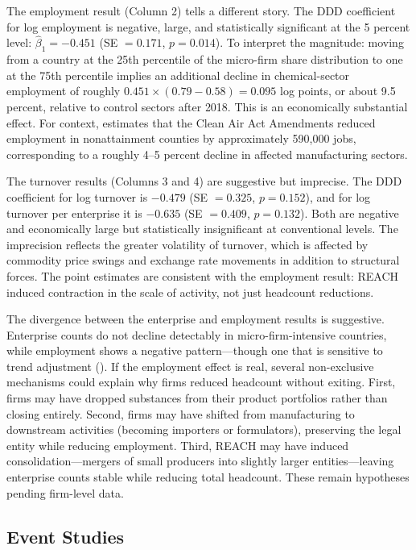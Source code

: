 \documentclass[12pt]{article}
\begin{document}
The employment result (Column 2) tells a different story. The DDD coefficient for log employment is negative, large, and statistically significant at the 5 percent level: $\hat{\beta}_1 = -0.451$ (SE $= 0.171$, $p = 0.014$). To interpret the magnitude: moving from a country at the 25th percentile of the micro-firm share distribution to one at the 75th percentile implies an additional decline in chemical-sector employment of roughly $0.451 \times (0.79 - 0.58) = 0.095$ log points, or about 9.5 percent, relative to control sectors after 2018. This is an economically substantial effect. For context, \citet{greenstone2002} estimates that the Clean Air Act Amendments reduced employment in nonattainment counties by approximately 590,000 jobs, corresponding to a roughly 4--5 percent decline in affected manufacturing sectors.

The turnover results (Columns 3 and 4) are suggestive but imprecise. The DDD coefficient for log turnover is $-0.479$ (SE $= 0.325$, $p = 0.152$), and for log turnover per enterprise it is $-0.635$ (SE $= 0.409$, $p = 0.132$). Both are negative and economically large but statistically insignificant at conventional levels. The imprecision reflects the greater volatility of turnover, which is affected by commodity price swings and exchange rate movements in addition to structural forces. The point estimates are consistent with the employment result: REACH induced contraction in the scale of activity, not just headcount reductions.

The divergence between the enterprise and employment results is suggestive. Enterprise counts do not decline detectably in micro-firm-intensive countries, while employment shows a negative pattern---though one that is sensitive to trend adjustment (). If the employment effect is real, several non-exclusive mechanisms could explain why firms reduced headcount without exiting. First, firms may have dropped substances from their product portfolios rather than closing entirely. Second, firms may have shifted from manufacturing to downstream activities (becoming importers or formulators), preserving the legal entity while reducing employment. Third, REACH may have induced consolidation---mergers of small producers into slightly larger entities---leaving enterprise counts stable while reducing total headcount. These remain hypotheses pending firm-level data.

\subsection{Event Studies}
\end{document}
